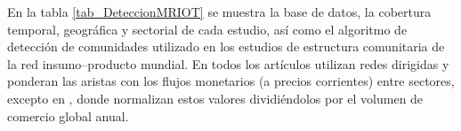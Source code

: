 En la tabla \ref{tab_DeteccionMRIOT} se muestra la base de datos, la cobertura temporal, geográfica y sectorial de cada estudio, así como el algoritmo de detección de comunidades utilizado en los estudios de estructura comunitaria de la red insumo--producto mundial. En todos los artículos utilizan redes dirigidas y ponderan las aristas con los flujos monetarios (a precios corrientes) entre sectores, excepto en \textcite{Maluck2015}, donde normalizan estos valores dividiéndolos por el volumen de comercio global anual.


\begin{table}[h]
	\centering
	\caption{Características de los estudios de detección de comunidades en redes insumo--producto globales}
	\label{tab_DeteccionMRIOT}
\end{table}

